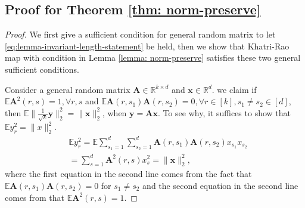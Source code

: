 \subsection*{Proof for Theorem \ref{thm: norm-preserve}}
\begin{proof}

We first give a sufficient condition for general random matrix to let  \eqref{eq:lemma-invariant-length-statement} be held, then we show that Khatri-Rao map with condition in Lemma \ref{lemma: norm-preserve} satisfies these two general sufficient conditions. \par 



Consider a general random matrix $\mathbf{A}\in \mathbb{R}^{k \times d}$ and $\mathbf{x} \in \mathbb{R}^d$.
we claim if ~$\mathbb{E}{\mathbf{A}^2(r,s)}=1, \forall r,s $ and $\mathbb{E}{\mathbf{A}(r,s_1)\mathbf{A}(r,s_2)} = 0, \forall r \in[k], s_1\neq s_2 \in[d]$,
then $\mathbb{E}\| \frac{1}{\sqrt{k}}\mathbf{y}\|_2^2 = \|\mathbf{x}\|_2^2$, when $\mathbf{y}=\mathbf{A}\mathbf{x}$. To see why, it suffices to show that $\mathbb{E} y_r^2 = \|x\|^2_2$.
\begin{equation} \label{eq:row-length}
\begin{aligned}
&\mathbb{E}{y_r^2} = \mathbb{E}{\sum_{s_1=1}^d\sum_{s_2=1}^d \mathbf{A}(r,s_1)\mathbf{A}(r,s_2)x_{s_1}x_{s_2}} \\
&= \sum_{s=1}^d \mathbf{A}^2(r,s)x_s^2 = \|\mathbf{x}\|^2_2,  \nonumber
\end{aligned}
\end{equation}
where the first equation in the second line comes from the fact that $\mathbb{E} {\mathbf{A}(r,s_1)\mathbf{A}(r,s_2)}  = 0$ for $s_1\neq s_2$ and the second equation in the second line comes from that $\mathbb{E}{\mathbf{A}^2(r,s)} =1$.


\end{proof}
